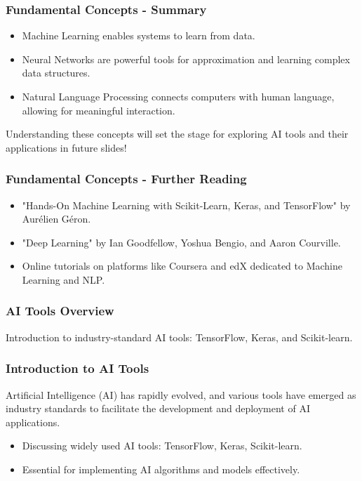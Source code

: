 \documentclass[aspectratio=169]{beamer}
\begin{document}
\begin{frame}[fragile]
    \frametitle{Fundamental Concepts - Summary}
    \begin{itemize}
        \item Machine Learning enables systems to learn from data.
        \item Neural Networks are powerful tools for approximation and learning complex data structures.
        \item Natural Language Processing connects computers with human language, allowing for meaningful interaction.
    \end{itemize}
    Understanding these concepts will set the stage for exploring AI tools and their applications in future slides!
\end{frame}

\begin{frame}[fragile]
    \frametitle{Fundamental Concepts - Further Reading}
    \begin{itemize}
        \item "Hands-On Machine Learning with Scikit-Learn, Keras, and TensorFlow" by Aurélien Géron.
        \item "Deep Learning" by Ian Goodfellow, Yoshua Bengio, and Aaron Courville.
        \item Online tutorials on platforms like Coursera and edX dedicated to Machine Learning and NLP.
    \end{itemize}
\end{frame}

\begin{frame}
    \frametitle{AI Tools Overview}
    Introduction to industry-standard AI tools: TensorFlow, Keras, and Scikit-learn.
\end{frame}

\begin{frame}
    \frametitle{Introduction to AI Tools}
    Artificial Intelligence (AI) has rapidly evolved, and various tools have emerged as industry standards to facilitate the development and deployment of AI applications. 
    \begin{itemize}
        \item Discussing widely used AI tools: TensorFlow, Keras, Scikit-learn.
        \item Essential for implementing AI algorithms and models effectively.
    \end{itemize}
\end{frame}
\end{document}
